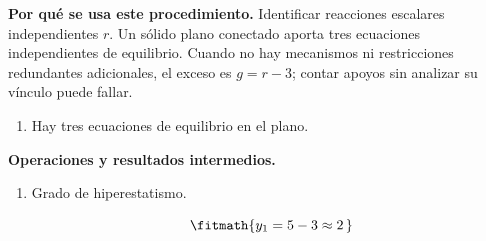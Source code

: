 \noindent\textbf{Por qué se usa este procedimiento.} Identificar reacciones escalares independientes $r$. Un sólido plano conectado aporta tres ecuaciones independientes de equilibrio. Cuando no hay mecanismos ni restricciones redundantes adicionales, el exceso es $g=r-3$; contar apoyos sin analizar su vínculo puede fallar.

\begin{enumerate}

\item Hay tres ecuaciones de equilibrio en el plano.

\end{enumerate}

\noindent\textbf{Operaciones y resultados intermedios.}

\begin{enumerate}

\item Grado de hiperestatismo.

\[\fitmath{y_{1}=5-3\approx 2\,}\]

\end{enumerate}
